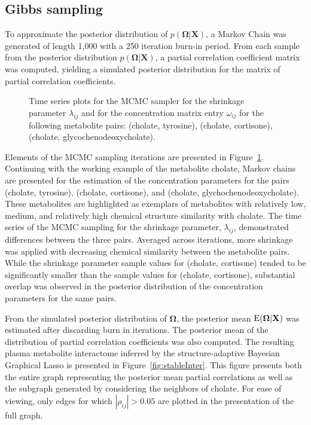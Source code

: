 \begin{DoubleSpace*}
\section{Gibbs sampling}
To approximate the posterior distribution of $p(\boldsymbol{\Omega}|\textbf{X})$, a Markov Chain was generated of length 1,000 with a 250 iteration burn-in period. From each sample from the posterior distribution $p(\boldsymbol{\Omega}|\textbf{X})$, a partial correlation coefficient matrix was computed, yielding a simulated posterior distribution for the matrix of partial correlation coefficients.

\begin{figure}[h!]
	\caption[Add caption]{Time series plots for the MCMC sampler for the shrinkage parameter $\lambda_{ij}$ and for the concentration matrix entry $\omega_{ij}$ for the following metabolite pairs: (cholate, tyrosine), (cholate, cortisone), (cholate, glycochenodeoxycholate).  \label{fig:mcmc} }
\end{figure}

Elements of the MCMC sampling iterations are presented in Figure~\ref{fig:mcmc}. Continuing with the working example of the metabolite cholate, Markov chains are presented for the estimation of the concentration parameters for the pairs (cholate, tyrosine), (cholate, cortisone), and (cholate, glychochenodeoxycholate). These metabolites are highlighted as exemplars of metabolites with relatively low, medium, and relatively high chemical structure similarity with cholate. The time series of the MCMC sampling for the shrinkage parameter, $\lambda_{ij}$, demonstrated differences between the three pairs. Averaged across iterations, more shrinkage was applied with decreasing chemical similarity between the metabolite pairs. While the shrinkage parameter sample values for (cholate, cortisone) tended to be significantly smaller than the sample values for (cholate, cortisone), substantial overlap was observed in the posterior distribution of the concentration parameters for the same pairs.

From the simulated posterior distribution of $\boldsymbol{\Omega}$, the posterior mean $\operatorname{E}(\boldsymbol{\Omega}|\textbf{X})$ was estimated after discarding burn in iterations. The posterior mean of the distribution of partial correlation coefficients was also computed. The resulting plasma metabolite interactome inferred by the structure-adaptive Bayesian Graphical Lasso is presented in Figure~\ref{fig:stableInter}. This figure presents both the entire graph representing the posterior mean partial correlations as well as the subgraph generated by considering the neighbors of cholate. For ease of viewing, only edges for which $|\rho_{ij}|>0.05$ are plotted in the presentation of the full graph. 


\end{DoubleSpace*}

